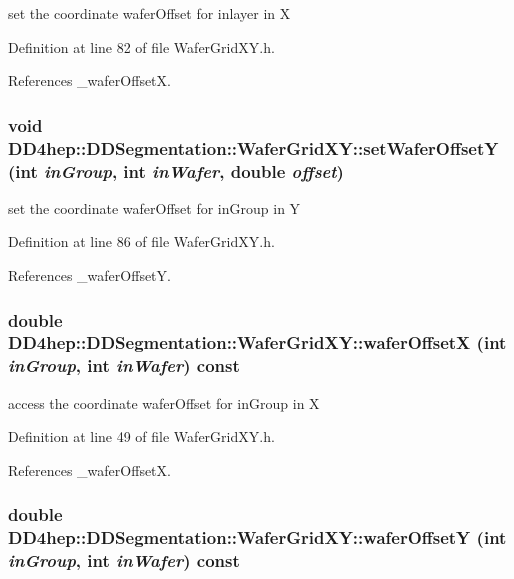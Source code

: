 set the coordinate waferOffset for inlayer in X 

Definition at line 82 of file WaferGridXY.h.

References \_\-waferOffsetX.\hypertarget{class_d_d4hep_1_1_d_d_segmentation_1_1_wafer_grid_x_y_acb1ddfacb3dd3702f7e7102cc29d3930}{
\subsubsection[{setWaferOffsetY}]{\setlength{\rightskip}{0pt plus 5cm}void DD4hep::DDSegmentation::WaferGridXY::setWaferOffsetY (int {\em inGroup}, \/  int {\em inWafer}, \/  double {\em offset})}}
\label{class_d_d4hep_1_1_d_d_segmentation_1_1_wafer_grid_x_y_acb1ddfacb3dd3702f7e7102cc29d3930}


set the coordinate waferOffset for inGroup in Y 

Definition at line 86 of file WaferGridXY.h.

References \_\-waferOffsetY.\hypertarget{class_d_d4hep_1_1_d_d_segmentation_1_1_wafer_grid_x_y_a1ba9227771178c13a81dac8e9dd6be93}{
\subsubsection[{waferOffsetX}]{\setlength{\rightskip}{0pt plus 5cm}double DD4hep::DDSegmentation::WaferGridXY::waferOffsetX (int {\em inGroup}, \/  int {\em inWafer}) const}}
\label{class_d_d4hep_1_1_d_d_segmentation_1_1_wafer_grid_x_y_a1ba9227771178c13a81dac8e9dd6be93}


access the coordinate waferOffset for inGroup in X 

Definition at line 49 of file WaferGridXY.h.

References \_\-waferOffsetX.\hypertarget{class_d_d4hep_1_1_d_d_segmentation_1_1_wafer_grid_x_y_a26b73391d98877b2d2a18bcc21c7a910}{
\subsubsection[{waferOffsetY}]{\setlength{\rightskip}{0pt plus 5cm}double DD4hep::DDSegmentation::WaferGridXY::waferOffsetY (int {\em inGroup}, \/  int {\em inWafer}) const}}
\label{class_d_d4hep_1_1_d_d_segmentation_1_1_wafer_grid_x_y_a26b73391d98877b2d2a18bcc21c7a910}


